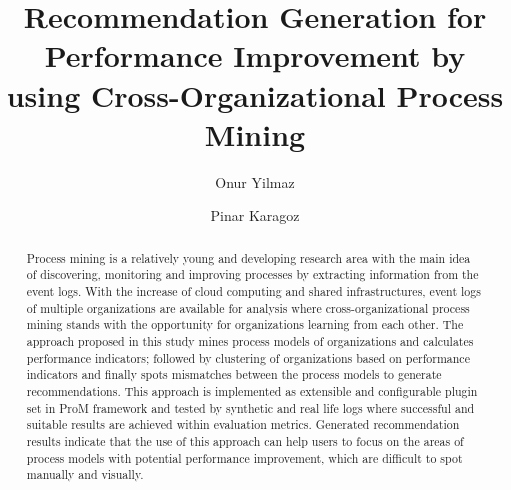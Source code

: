 \documentclass[runningheads,a4paper]{llncs}
\begin{document}


\title{Recommendation Generation for Performance Improvement by using Cross-Organizational Process Mining}
{}



\author{Onur Yilmaz \and Pinar Karagoz}
%
\iffalse
\author{Firstname Lastname\inst{1} \and Firstname Lastname\inst{2} }

\institute{
Insitute 1\\
\email{...}\and
Insitute 2\\
\email{...}
}
\fi
			
\maketitle

\begin{abstract}
Process mining is a relatively young and developing research area with the main idea of discovering, monitoring and improving processes by extracting information from the event logs. With the increase of cloud computing and shared infrastructures, event logs of multiple organizations are available for analysis where cross-organizational process mining stands with the opportunity for organizations learning from each other. The approach proposed in this study mines process models of organizations and calculates performance indicators; followed by clustering of organizations based on performance indicators and finally spots mismatches between the process models to generate recommendations. This approach is implemented as extensible and configurable plugin set in ProM framework and tested by synthetic and real life logs where successful and suitable results are achieved within evaluation metrics. Generated recommendation results indicate that the use of this approach can help users to focus on the areas of process models with potential performance improvement, which are difficult to spot manually and visually.
\end{abstract}
\end{document}
